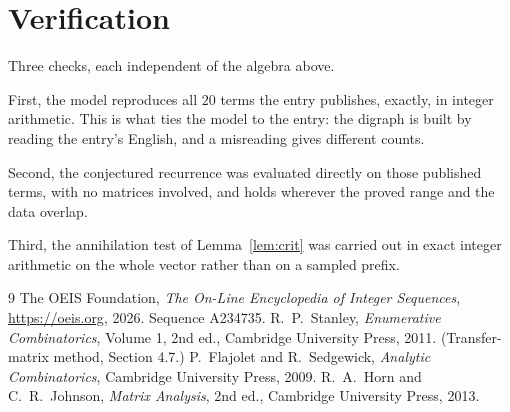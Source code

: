 \documentclass[11pt,a4paper]{article}
\theoremstyle{plain}
\theoremstyle{definition}
\begin{document}
\section{Verification}

Three checks, each independent of the algebra above.

First, the model reproduces all $20$ terms the entry publishes, exactly, in integer
arithmetic. This is what ties the model to the entry: the digraph is built by reading the
entry's English, and a misreading gives different counts.

Second, the conjectured recurrence was evaluated directly on those published terms, with no
matrices involved, and holds wherever the proved range and the data overlap.

Third, the annihilation test of Lemma~\ref{lem:crit} was carried out in exact integer
arithmetic on the whole vector rather than on a sampled prefix.

\begin{thebibliography}{9}
 The OEIS Foundation, \emph{The On-Line Encyclopedia of Integer
Sequences}, \url{https://oeis.org}, 2026. Sequence A234735.
 R.~P.~Stanley, \emph{Enumerative Combinatorics}, Volume 1, 2nd ed.,
Cambridge University Press, 2011. (Transfer-matrix method, Section 4.7.)
 P.~Flajolet and R.~Sedgewick, \emph{Analytic Combinatorics}, Cambridge
University Press, 2009.
 R.~A.~Horn and C.~R.~Johnson, \emph{Matrix Analysis}, 2nd ed., Cambridge
University Press, 2013.
\end{thebibliography}
\end{document}
